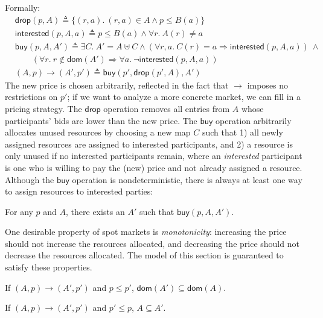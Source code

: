 \documentclass[acmsmall,review,screen]{acmart}
\begin{document}
Formally:
\begin{align*}
&\mathsf{drop}(p, A) \triangleq \{(r, a).\ (r, a) \in A \land p \leq B(a)\}\\
&\mathsf{interested}(p, A, a) \triangleq p \leq B(a) \land \forall r.\ A(r) \neq a\\
&\mathsf{buy}(p, A, A') \triangleq \exists C.\ A' = A \uplus C \land (\forall r, a.\ C(r) = a \Rightarrow \mathsf{interested}(p, A, a))\ \land \\&\qquad (\forall r.\ r \not\in \mathsf{dom}(A') \Rightarrow \forall a.\ \neg \mathsf{interested}(p, A, a))\\
&(A, p) \rightarrow (A', p') \triangleq \mathsf{buy}(p', \mathsf{drop}(p', A), A')
\end{align*}
The new price is chosen arbitrarily, reflected in the fact that $\rightarrow$ imposes no restrictions on $p'$; if we want to analyze a more concrete market, we can fill in a pricing strategy. The $\mathsf{drop}$ operation removes all entries from $A$ whose participants' bids are lower than the new price. The $\mathsf{buy}$ operation arbitrarily allocates unused resources by choosing a new map $C$ such that 1) all newly assigned resources are assigned to interested participants, and 2) a resource is only unused if no interested participants remain, where an \emph{interested} participant is one who is willing to pay the (new) price and not already assigned a resource.
Although the $\mathsf{buy}$ operation is nondeterministic, there is always at least one way to assign resources to interested parties:
\begin{theorem} For any $p$ and $A$, there exists an $A'$ such that $\mathsf{buy}(p, A, A')$.
\end{theorem}

One desirable property of spot markets is \emph{monotonicity}: increasing the price should not increase the resources allocated, and decreasing the price should not decrease the resources allocated. The model of this section is guaranteed to satisfy these properties.
\begin{theorem} If $(A, p) \rightarrow (A', p')$ and $p \leq p'$, $\mathsf{dom}(A') \subseteq \mathsf{dom}(A)$.
\end{theorem}
\begin{theorem} If $(A, p) \rightarrow (A', p')$ and $p' \leq p$, $A \subseteq A'$.
\end{theorem}
\end{document}
